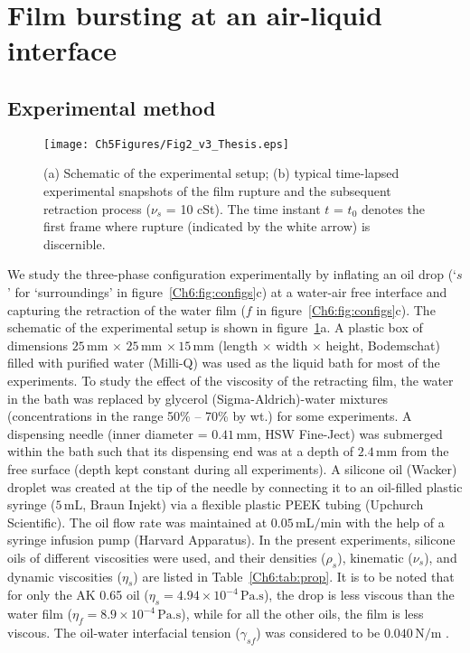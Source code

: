 \section{Film bursting at an air-liquid interface}

\subsection{Experimental method}
\label{Ch6:sec:3-phaseTC Exp methods}
\begin{figure}
	\centering
	\texttt{[image: Ch5Figures/Fig2\_v3\_Thesis.eps]}
	\caption{(a) Schematic of the experimental setup; (b) typical time-lapsed experimental snapshots of the film rupture and the subsequent retraction process ($\nu_{s}$ = 10 cSt). The time instant $t$ = $t_{0}$ denotes the first frame where rupture (indicated by the white arrow) is discernible.}
	\label{Ch6:fig:setup}
\end{figure}

We study the three-phase configuration experimentally by inflating an oil drop (`$s$' for `surroundings' in figure~\ref{Ch6:fig:configs}c) at a water-air free interface and capturing the retraction of the water film ($f$ in figure~\ref{Ch6:fig:configs}c). The schematic of the experimental setup is shown in figure~\ref{Ch6:fig:setup}a. A plastic box of dimensions $25\,\si{\milli\meter}\,\times\,25\,\si{\milli\meter}\,\times15\,\si{\milli\meter}$ (length $\times$ width $\times$ height, Bodemschat) filled with purified water (Milli-Q) was used as the liquid bath for most of the experiments. To study the effect of the viscosity of the retracting film, the water in the bath was replaced by glycerol (Sigma-Aldrich)-water mixtures (concentrations in the range 50\% -- 70\% by wt.) for some experiments. A dispensing needle (inner diameter = $0.41\,\si{\milli\meter}$, HSW Fine-Ject) was submerged within the bath such that its dispensing end was at a depth of $2.4\,\si{\milli\meter}$ from the free surface (depth kept constant during all experiments). A silicone oil (Wacker) droplet was created at the tip of the needle by connecting it to an oil-filled plastic syringe ($5\,\si{\milli\liter}$, Braun Injekt) via a flexible plastic PEEK tubing (Upchurch Scientific). The oil flow rate was maintained at $0.05\,\si{\milli\liter}/\si{\minute}$ with the help of a syringe infusion pump (Harvard Apparatus). In the present experiments, silicone oils of different viscosities were used, and their densities ($\rho_{s}$), kinematic ($\nu_{s}$), and dynamic viscosities ($\eta_{s}$) are listed in Table~\ref{Ch6:tab:prop}. It is to be noted that for only the AK 0.65 oil ($\eta_{s} = 4.94 \times 10^{-4}\,\si{\pascal}.\si{\second}$), the drop is less viscous than the water film ($\eta_{f} = 8.9 \times 10^{-4}\,\si{\pascal}.\si{\second}$), while for all the other oils, the film is less viscous. The oil-water interfacial tension ($\gamma_{sf}$) was considered to be $0.040\,\si{\newton}/\si{\meter}$ \citep{peters-2013-colloidssurfa}. 

